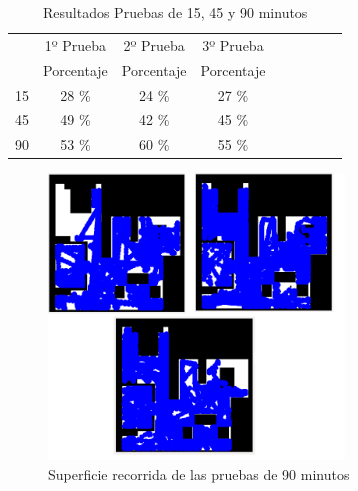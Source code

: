 \begin{table}[]
\centering
\caption{Resultados Pruebas de 15, 45 y 90 minutos}
\label{resultados_periodos}
\begin{tabular}{c|c|c|c|c|c|c|c|c|}
\cline{2-4}
                          & \multicolumn{1}{c|}{1º Prueba} & \multicolumn{1}{c|}{2º Prueba} & \multicolumn{1}{c|}{3º Prueba} \\ \cline{2-4} 
                         & Porcentaje       & Porcentaje       & Porcentaje     \\ \hline
\multicolumn{1}{|c|}{15} & 28 \%            & 24 \%            & 27 \%          \\ \hline
\multicolumn{1}{|c|}{45} & 49 \%            & 42 \%            & 45 \%          \\ \hline
\multicolumn{1}{|c|}{90} & 53 \%            & 60 \%            & 55 \%          \\ \hline
\end{tabular}
\end{table}

\begin{figure}[H]
  \begin{center}
    \includegraphics[width=0.7\textwidth]{figures/Vacuum/Referee_hora.png}
		\caption{Superficie recorrida de las pruebas de 90 minutos}
		\label{fig.Referee_hora}
		\end{center}
\end{figure}